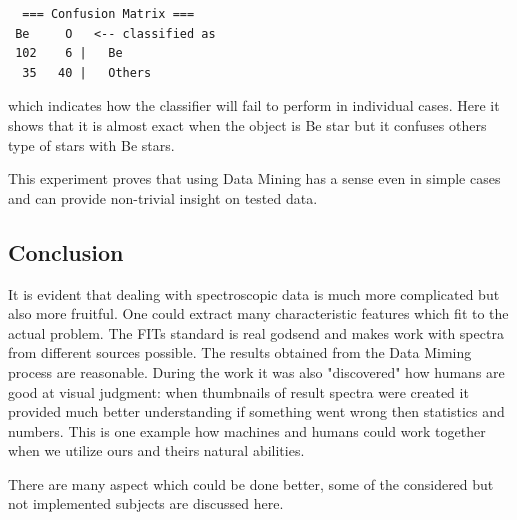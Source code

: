 \begin{lstlisting}
  === Confusion Matrix ===
 Be     O   <-- classified as
 102    6 |   Be
  35   40 |   Others
\end{lstlisting}

which indicates how the classifier will fail to perform in individual
cases. Here it shows that it is almost exact when the object is Be
star but it confuses others type of stars with Be stars.

This experiment proves that using Data Mining has a sense even in
simple cases and can provide non-trivial insight on tested data.





\subsection{Conclusion}

It is evident that dealing with spectroscopic data is much more
complicated but also more fruitful. One could extract many
characteristic features which fit to the actual problem. The FITs
standard is real godsend and makes work with spectra from different
sources possible. The results obtained from the Data Miming process
are reasonable. During the work it was also "discovered" how humans
are good at visual judgment: when thumbnails of result spectra were
created it provided much better understanding if something went wrong
then statistics and numbers. This is one example how machines and
humans could work together when we utilize ours and theirs natural
abilities.

There are many aspect which could be done better, some of the
considered but not implemented subjects are discussed here.

